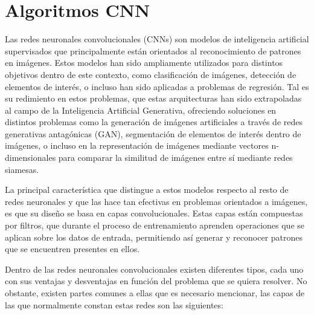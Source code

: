 \documentclass{uathesis-es}
\begin{document}
\section{Algoritmos CNN}
\label{CNN_SECTION}



Las redes neuronales convolucionales (CNNs) son modelos de inteligencia artificial supervisados que principalmente están orientados al reconocimiento de patrones en imágenes. Estos modelos han sido ampliamente utilizados para distintos objetivos dentro de este contexto, como clasificación de imágenes, detección de elementos de interés, o incluso han sido aplicadas a problemas de regresión. Tal es su redimiento en estos problemas, que estas arquitecturas han sido extrapoladas al campo de la Inteligencia Artificial Generativa, ofreciendo soluciones en distintos problemas como la generación de imágenes artificiales a través de redes generativas antagónicas (GAN), segmentación de elementos de interés dentro de imágenes, o incluso en la representación de imágenes mediante vectores n-dimensionales para comparar la similitud de imágenes entre sí mediante redes siamesas.

La principal característica que distingue a estos modelos respecto al resto de redes neuronales y que las hace tan efectivas en problemas orientados a imágenes, es que su diseño se basa en capas convolucionales. Estas capas están compuestas por filtros, que durante el proceso de entrenamiento aprenden operaciones que se aplican sobre los datos de entrada, permitiendo así generar y reconocer patrones que se encuentren presentes en ellos.

Dentro de las redes neuronales convolucionales existen diferentes tipos, cada uno con sus ventajas y desventajas en función del problema que se quiera resolver. No obstante, existen partes comunes a ellas que es necesario mencionar, las capas de las que normalmente constan estas redes son las siguientes:
\end{document}

